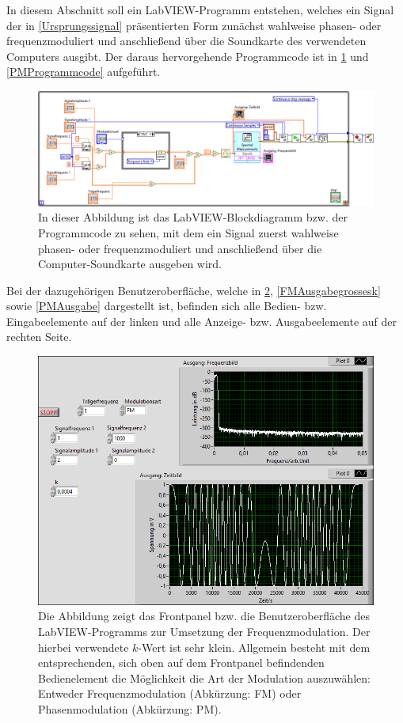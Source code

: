 \documentclass[
a4paper,
12pt,
pagesize,
ngerman
]{scrartcl}
\begin{document}
	In diesem Abschnitt soll ein LabVIEW-Programm entstehen, welches ein Signal der in \cref{Ursprungssignal} präsentierten Form zunächst wahlweise phasen- oder frequenzmoduliert und anschließend über die Soundkarte des verwendeten Computers ausgibt. 
	Der daraus hervorgehende Programmcode ist in \cref{FMProgrammcode} und \cref{PMProgrammcode} aufgeführt.
	
	\begin{figure}[H]
		\centering
		\includegraphics[width=1.0\textwidth]{EIRE2018Dateien/Tag4/FMPM-Erzeugung/FMPM-Erzeugungd}
		\caption{In dieser Abbildung ist das LabVIEW-Blockdiagramm bzw. der Programmcode zu sehen, mit dem ein Signal zuerst wahlweise phasen- oder frequenzmoduliert und anschließend über die Computer-Soundkarte ausgeben wird.}
		\label{FMProgrammcode}
	\end{figure}
	
	\noindent Bei der dazugehörigen Benutzeroberfläche, welche in \cref{FMAusgabekleinesk}, \cref{FMAusgabegrossesk} sowie \cref{PMAusgabe} dargestellt ist, befinden sich alle Bedien- bzw. Eingabeelemente auf der linken und alle Anzeige- bzw. Ausgabeelemente auf der rechten Seite.
	
	\begin{figure}[H]
		\centering
		\includegraphics[width=1.0\textwidth]{EIRE2018Dateien/Tag4/FMPM-Erzeugung/FM-FMPM-Erzeugungp}
		\caption{Die Abbildung zeigt das Frontpanel bzw. die Benutzeroberfläche des LabVIEW-Programms zur Umsetzung der Frequenzmodulation. Der hierbei verwendete $k$-Wert ist sehr klein. Allgemein besteht mit dem entsprechenden, sich oben auf dem Frontpanel befindenden Bedienelement die Möglichkeit die Art der Modulation auszuwählen: Entweder Frequenzmodulation (Abkürzung: FM) oder Phasenmodulation (Abkürzung: PM).}
		\label{FMAusgabekleinesk}
	\end{figure}
	
\end{document}
